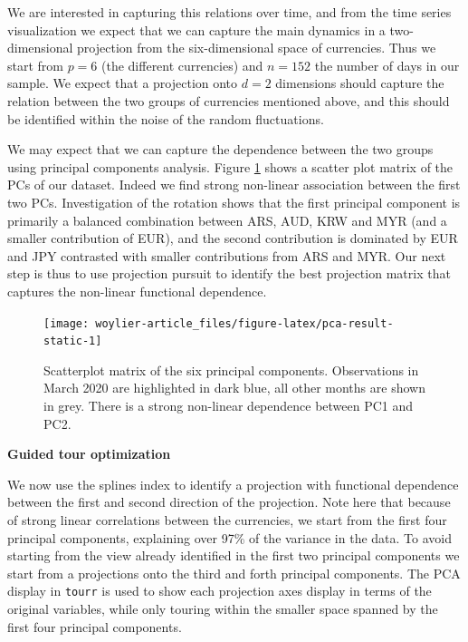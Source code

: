 We are interested in capturing this relations over time, and from the
time series visualization we expect that we can capture the main
dynamics in a two-dimensional projection from the six-dimensional space
of currencies. Thus we start from \(p=6\) (the different currencies) and
\(n=152\) the number of days in our sample. We expect that a projection
onto \(d=2\) dimensions should capture the relation between the two
groups of currencies mentioned above, and this should be identified
within the noise of the random fluctuations.

We may expect that we can capture the dependence between the two groups
using principal components analysis. Figure \ref{fig:pca-result-static}
shows a scatter plot matrix of the PCs of our dataset. Indeed we find
strong non-linear association between the first two PCs. Investigation
of the rotation shows that the first principal component is primarily a
balanced combination between ARS, AUD, KRW and MYR (and a smaller
contribution of EUR), and the second contribution is dominated by EUR
and JPY contrasted with smaller contributions from ARS and MYR. Our next
step is thus to use projection pursuit to identify the best projection
matrix that captures the non-linear functional dependence.

\begin{Schunk}
\begin{figure}

{\centering \texttt{[image: woylier-article\_files/figure-latex/pca-result-static-1]} 

}

\caption[Scatterplot matrix of the six principal components]{Scatterplot matrix of the six principal components. Observations in March 2020 are highlighted in dark blue, all other months are shown in grey. There is a strong non-linear dependence between PC1 and PC2.}\label{fig:pca-result-static}
\end{figure}
\end{Schunk}

\textbf{Guided tour optimization}

We now use the splines index to identify a projection with functional
dependence between the first and second direction of the projection.
Note here that because of strong linear correlations between the
currencies, we start from the first four principal components,
explaining over 97\% of the variance in the data. To avoid starting from
the view already identified in the first two principal components we
start from a projections onto the third and forth principal components.
The PCA display in \texttt{tourr} is used to show each projection axes
display in terms of the original variables, while only touring within
the smaller space spanned by the first four principal components.

